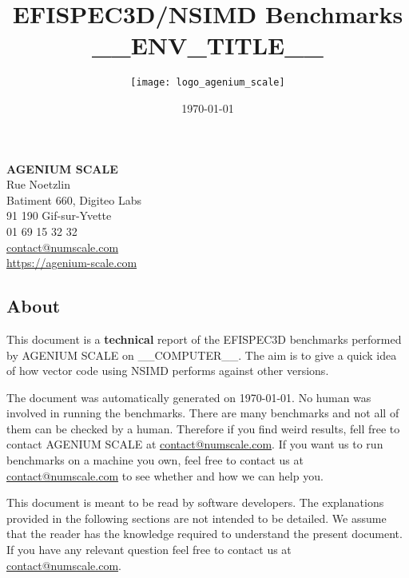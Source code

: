 \documentclass[a4paper,11pt]{article}
\date{\today}
\author{\texttt{[image: logo\_agenium\_scale]}}
\title{EFISPEC3D/NSIMD Benchmarks __ENV_TITLE__}
\newcommand{\efispec}{EFISPEC3D}
\newcommand{\nsimd}{NSIMD}
\newcommand{\ageniumscale}{AGENIUM SCALE}
\begin{document}
\maketitle%
\vspace*{\fill}%
\noindent%
\textbf{\ageniumscale{}}\\
Rue Noetzlin\\
Batiment 660, Digiteo Labs\\
91 190 Gif-sur-Yvette\\
01 69 15 32 32\\
\href{mailto://contact@numscale.com}{contact@numscale.com}\\
\href{https://agenium-scale.com}{https://agenium-scale.com}\\
\thispagestyle{empty}
\clearpage
%
\thispagestyle{empty}
\tableofcontents
\newpage

\subsection*{About}%
\label{sec:about}

This document is a \textbf{technical} report of the \efispec{} benchmarks
performed by \ageniumscale{} on __COMPUTER__. The aim
is to give a quick idea of how vector code using \nsimd{} performs against
other versions.

The document was automatically generated on \today. No human was involved in
running the benchmarks. There are many benchmarks and not all of them can be
checked by a human. Therefore if you find weird results, fell free to contact
\ageniumscale{} at \href{mailto://contact@numscale.com}{contact@numscale.com}.
If you want us to run benchmarks on a machine you own, feel free to contact us
at \href{mailto://contact@numscale.com}{contact@numscale.com} to see whether
and how we can help you.

This document is meant to be read by software developers. The explanations
provided in the following sections are not intended to be detailed. We assume
that the reader has the knowledge required to understand the present document.
If you have any relevant question feel free to contact us at
\href{mailto://contact@numscale.com}{contact@numscale.com}.
\end{document}
